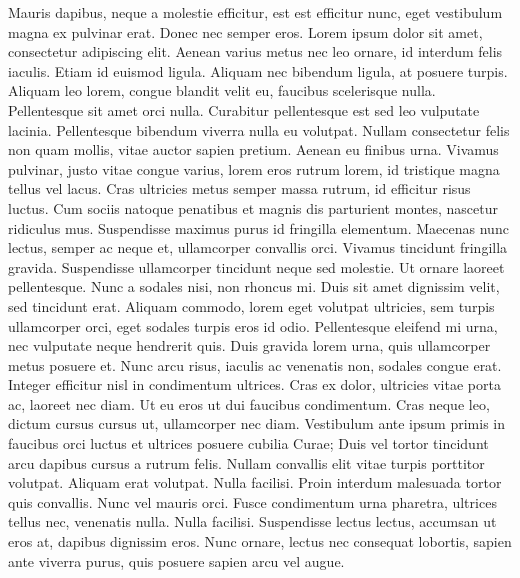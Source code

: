 \documentclass{article}
\newcounter{notes}
\newcommand{\notes}{\textbf{\thenotes}}
\begin{document}
{{ Mauris dapibus, neque a molestie efficitur, est est efficitur nunc, eget vestibulum magna ex pulvinar erat. \notes
 Donec nec semper eros. \notes
 Lorem ipsum dolor sit amet, consectetur adipiscing elit. \notes
 Aenean varius metus nec leo ornare, id interdum felis iaculis. \notes
 Etiam id euismod ligula. \notes
 Aliquam nec bibendum ligula, at posuere turpis. \notes
 Aliquam leo lorem, congue blandit velit eu, faucibus scelerisque nulla. \notes
 Pellentesque sit amet orci nulla. \notes
 Curabitur pellentesque est sed leo vulputate lacinia. \notes
 Pellentesque bibendum viverra nulla eu volutpat. \notes
 Nullam consectetur felis non quam mollis, vitae auctor sapien pretium. \notes
 Aenean eu finibus urna. \notes
 Vivamus pulvinar, justo vitae congue varius, lorem eros rutrum lorem, id tristique magna tellus vel lacus. \notes
 Cras ultricies metus semper massa rutrum, id efficitur risus luctus. \notes
 Cum sociis natoque penatibus et magnis dis parturient montes, nascetur ridiculus mus. \notes
 Suspendisse maximus purus id fringilla elementum. \notes
 Maecenas nunc lectus, semper ac neque et, ullamcorper convallis orci. \notes
 Vivamus tincidunt fringilla gravida. \notes
 Suspendisse ullamcorper tincidunt neque sed molestie. \notes
 Ut ornare laoreet pellentesque. \notes
 Nunc a sodales nisi, non rhoncus mi. \notes
 Duis sit amet dignissim velit, sed tincidunt erat. \notes
 Aliquam commodo, lorem eget volutpat ultricies, sem turpis ullamcorper orci, eget sodales turpis eros id odio. \notes
 Pellentesque eleifend mi urna, nec vulputate neque hendrerit quis. \notes
 Duis gravida lorem urna, quis ullamcorper metus posuere et. \notes
 Nunc arcu risus, iaculis ac venenatis non, sodales congue erat. \notes
 Integer efficitur nisl in condimentum ultrices. \notes
 Cras ex dolor, ultricies vitae porta ac, laoreet nec diam. \notes
 Ut eu eros ut dui faucibus condimentum. \notes
 Cras neque leo, dictum cursus cursus ut, ullamcorper nec diam. \notes
 Vestibulum ante ipsum primis in faucibus orci luctus et ultrices posuere cubilia Curae; Duis vel tortor tincidunt arcu dapibus cursus a rutrum felis. \notes
 Nullam convallis elit vitae turpis porttitor volutpat. \notes
 Aliquam erat volutpat. \notes
 Nulla facilisi. \notes
 Proin interdum malesuada tortor quis convallis. \notes
 Nunc vel mauris orci. \notes
 Fusce condimentum urna pharetra, ultrices tellus nec, venenatis nulla. \notes
 Nulla facilisi. \notes
 Suspendisse lectus lectus, accumsan ut eros at, dapibus dignissim eros. \notes
 Nunc ornare, lectus nec consequat lobortis, sapien ante viverra purus, quis posuere sapien arcu vel augue. \notes
}}
\end{document}
